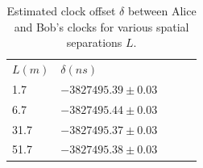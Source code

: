 \documentclass[aps,pra,onecolumn, superscriptaddress]{revtex4}
\begin{document}
\begin{table}[htbp]
\centering
\label{table:offsets}
\begin{tabular}{lllll}
$L(m)$ & $\delta(ns)$\\
 1.7 & $-3827495.39\pm0.03$\\
 6.7 & $-3827495.44\pm0.03$ \\
 31.7 & $-3827495.37\pm0.03$\\
 51.7 & $-3827495.38\pm0.03$
\end{tabular}
\caption{Estimated clock offset $\delta$ between Alice and Bob's clocks for various spatial separations $L$.}
\end{table}

     
\end{document}
